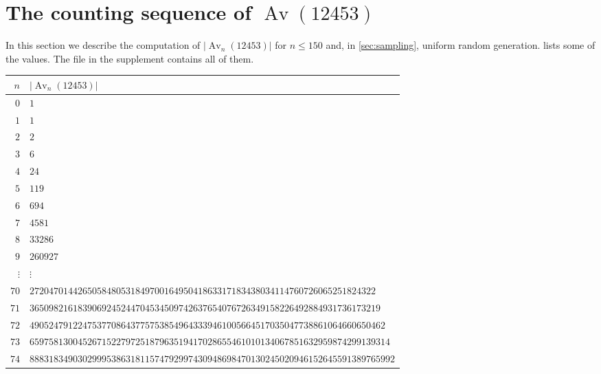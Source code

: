 \documentclass[11pt,reqno]{amsart}
\theoremstyle{definition}
\theoremstyle{remark}
\newcommand{\Av}{\operatorname{Av}}
\begin{document}
\section{The counting sequence of \texorpdfstring{$\Av(12453)$}{Av(12453)}}
\label{sec:computations}

In this section we describe the computation of $\lvert\Av_n(12453)\rvert$ for
$n\leq150$ and, in \cref{sec:sampling}, uniform random generation.
 lists some of the values.  The file
 in the supplement contains all of
them.

\begin{table}[tb]
\centering
\scriptsize
\begin{tabular}{@{}r>{\raggedright\arraybackslash}p{}@{}}
\toprule
$n$ & $\lvert\Av_n(12453)\rvert$ \\
\midrule
$ 0 $ & $ 1 $ \\
$ 1 $ & $ 1 $ \\
$ 2 $ & $ 2 $ \\
$ 3 $ & $ 6 $ \\
$ 4 $ & $ 24 $ \\
$ 5 $ & $ 119 $ \\
$ 6 $ & $ 694 $ \\
$ 7 $ & $ 4581 $ \\
$ 8 $ & $ 33286 $ \\
$ 9 $ & $ 260927 $ \\
$\vdots$ & $\vdots$ \\
$ 70 $ & $ 2720470144\allowbreak 2650584805\allowbreak 3184970016\allowbreak 4950418633\allowbreak 1718343803\allowbreak 4114760726\allowbreak 0652518243\allowbreak 22 $ \\
$ 71 $ & $ 3650982161\allowbreak 8390692452\allowbreak 4470453450\allowbreak 9742637654\allowbreak 0767263491\allowbreak 5822649288\allowbreak 4931736173\allowbreak 219 $ \\
$ 72 $ & $ 4905247912\allowbreak 2475377086\allowbreak 4377575385\allowbreak 4964333946\allowbreak 1005664517\allowbreak 0350477388\allowbreak 6106466065\allowbreak 0462 $ \\
$ 73 $ & $ 6597581300\allowbreak 4526715227\allowbreak 9725187963\allowbreak 5194170286\allowbreak 5546101013\allowbreak 4067851632\allowbreak 9598742991\allowbreak 39314 $ \\
$ 74 $ & $ 8883183490\allowbreak 3029995386\allowbreak 3181157479\allowbreak 2997430948\allowbreak 6984701302\allowbreak 4502094615\allowbreak 2645591389\allowbreak 765992 $ \\

\end{tabular}
\end{table}
\end{document}
